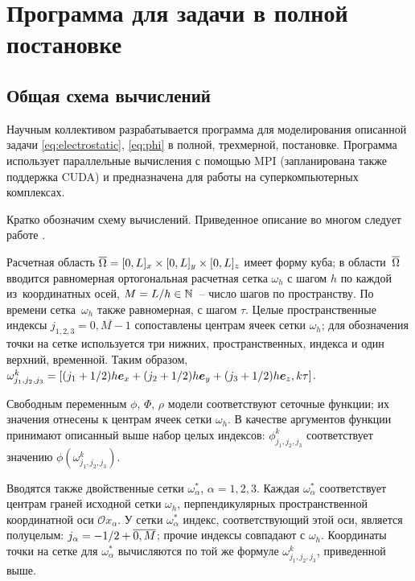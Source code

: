 
\section{Программа для задачи в полной постановке}
\label{sec:complete_program}

\subsection{Общая схема вычислений}

Научным коллективом разрабатывается программа для моделирования описанной задачи \eqref{eq:electrostatic}, \eqref{eq:phi} в полной, трехмерной, постановке. Программа использует параллельные вычисления с помощью MPI (запланирована также поддержка CUDA) и предназначена для работы на суперкомпьютерных комплексах.

Кратко обозначим схему вычислений. Приведенное описание во многом следует работе \cite{zipunova_computational}.

Расчетная область $\clOmega = [0, L]_x \times [0, L]_y \hm \times [0, L]_z$ имеет форму куба; в области~${\overline{\Omega}}$ вводится равномерная ортогональная расчетная сетка $\omega_h$ с шагом $h$ по каждой из~координатных осей, $M = L / h \in {\mathbb{N}}$~-- число шагов по пространству. По времени сетка~$\omega_h$ также равномерная, с шагом $\tau$. Целые пространственные индексы $j_{1,2,3} = \overline{0, M - 1}$ сопоставлены центрам ячеек сетки $\omega_h$; для обозначения точки на сетке используется три нижних, пространственных, индекса и один верхний, временной. Таким образом, $\omega_{j_1,j_2,j_3}^k = [(j_1 + 1/2)h \boldsymbol{e}_x + (j_2 + 1/2)h \boldsymbol{e}_y + (j_3 + 1/2)h \boldsymbol{e}_z, k \tau]$.

Свободным переменным $\phi$, $\Phi$, $\rho$ модели соответствуют сеточные функции; их значения отнесены к центрам ячеек сетки $\omega_h$. В качестве аргументов функции принимают описанный выше набор целых индексов: $\phi_{j_1,j_2,j_3}^k$ соответствует значению $\phi(\omega_{j_1,j_2,j_3}^k)$. 

Вводятся также двойственные сетки $\omega^*_\alpha$, $\alpha = 1,2,3$. Каждая $\omega^*_\alpha$ соответствует центрам граней исходной сетки $\omega_h$, перпендикулярных пространственной координатной оси $\mathcal{O}x_\alpha$. У сетки $\omega^*_\alpha$ индекс, соответствующий этой оси, является полуцелым: $j_\alpha \hm = -1/2 + \overline{0, M}$; прочие индексы совпадают с $\omega_h$. Координаты точки на сетке для $\omega^*_\alpha$ вычисляются по той же формуле $\omega_{j_1,j_2,j_3}^k$, приведенной выше.

